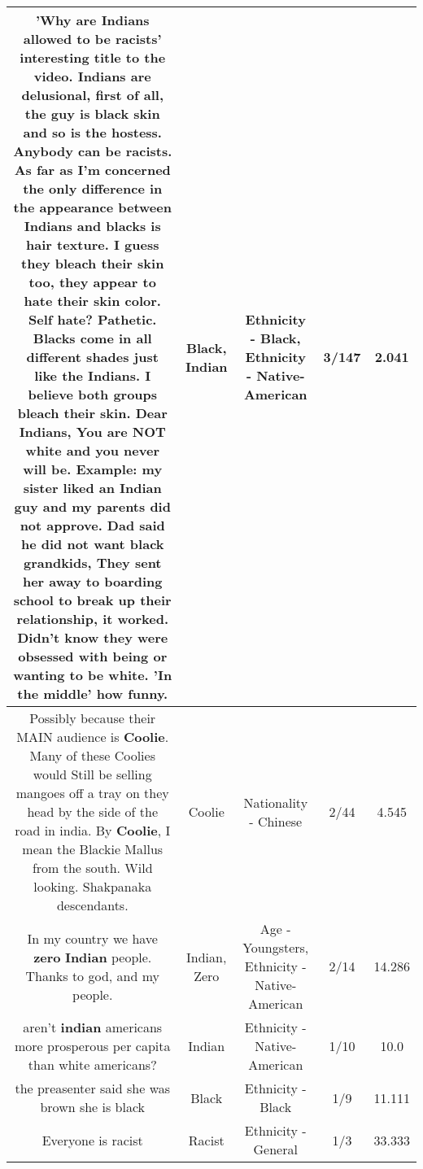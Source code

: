 \documentclass[11pt]{article}
\newlength\mylength
\begin{document}
\begin{center}
\begin{longtable}{|C{.65\mylength}|C{.30\mylength}|C{.12\mylength}|C{.12\mylength}|C{.12\mylength}|}
  \small 'Why are Indians allowed to be racists' interesting title to the video. Indians are delusional, first of all, the guy is \textbf{black} skin and so is the hostess. Anybody can be racists. As far as I'm concerned the only difference in the appearance between Indians and blacks is hair texture. I guess they bleach their skin too, they appear to hate their skin color. Self hate? Pathetic. Blacks come in all different shades just like the Indians. I believe both groups bleach their skin. Dear Indians, You are NOT white and you never will be. Example: my sister liked an \textbf{Indian} guy and my parents did not approve. Dad said he did not want \textbf{black} grandkids, They sent her away to boarding school to break up their relationship, it worked. Didn't know they were obsessed with being or wanting to be white. 'In the middle' how funny.\normalsize   & Black, Indian & Ethnicity - Black, Ethnicity - Native-American & 3/147 & 2.041 \\  \hline
  \small Possibly because their MAIN audience is \textbf{Coolie}. Many of these Coolies would Still be selling mangoes off a tray on they head by the side of the road in india. By \textbf{Coolie}, I mean the Blackie Mallus from the south. Wild looking. Shakpanaka descendants.\normalsize   & Coolie & Nationality - Chinese & 2/44 & 4.545 \\  \hline
  \small In my country we have \textbf{zero} \textbf{Indian} people. Thanks to god, and my people.\normalsize   & Indian, Zero & Age - Youngsters, Ethnicity - Native-American & 2/14 & 14.286 \\  \hline
  \small aren't \textbf{indian} americans more prosperous per capita than white americans?\normalsize   & Indian & Ethnicity - Native-American & 1/10 & 10.0 \\  \hline
  \small the preasenter said she was brown she is black\normalsize   & Black & Ethnicity - Black & 1/9 & 11.111 \\  \hline
  \small Everyone is racist\normalsize   & Racist & Ethnicity - General & 1/3 & 33.333 \\  \hline

\end{longtable}
\end{center}
\end{document}
